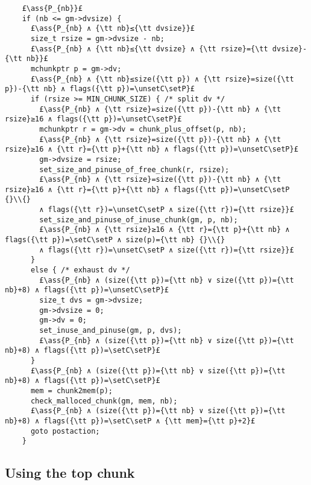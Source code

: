 \documentclass[10pt,a4paper,twoside]{report}
\makeatletter
\newcommand{\ml}[2][t]{\mbox{\mdseries\begin{tabular}[#1]{@{}L@{}}#2\end{tabular}}}
\newcommand{\ass}[1]{\ensuremath{{\color{blue}\left\{\ml[c]{#1}\right\}}}}
\newcommand{\setC}{\raisebox{1.5pt}{$\blacktriangledown$}}
\newcommand{\unsetC}{\raisebox{1.5pt}{$\triangledown$}}
\newcommand{\setP}{{\blacktriangle}}
\makeatother
\begin{document}
\begin{lstlisting}
    £\ass{P_{nb}}£
    if (nb <= gm->dvsize) {
      £\ass{P_{nb} ∧ {\tt nb}≤{\tt dvsize}}£
      size_t rsize = gm->dvsize - nb;
      £\ass{P_{nb} ∧ {\tt nb}≤{\tt dvsize} ∧ {\tt rsize}={\tt dvsize}-{\tt nb}}£
      mchunkptr p = gm->dv;
      £\ass{P_{nb} ∧ {\tt nb}≤size({\tt p}) ∧ {\tt rsize}=size({\tt p})-{\tt nb} ∧ flags({\tt p})=\unsetC\setP}£
      if (rsize >= MIN_CHUNK_SIZE) { /* split dv */
        £\ass{P_{nb} ∧ {\tt rsize}=size({\tt p})-{\tt nb} ∧ {\tt rsize}≥16 ∧ flags({\tt p})=\unsetC\setP}£
        mchunkptr r = gm->dv = chunk_plus_offset(p, nb);
        £\ass{P_{nb} ∧ {\tt rsize}=size({\tt p})-{\tt nb} ∧ {\tt rsize}≥16 ∧ {\tt r}={\tt p}+{\tt nb} ∧ flags({\tt p})=\unsetC\setP}£
        gm->dvsize = rsize;
        set_size_and_pinuse_of_free_chunk(r, rsize);
        £\ass{P_{nb} ∧ {\tt rsize}=size({\tt p})-{\tt nb} ∧ {\tt rsize}≥16 ∧ {\tt r}={\tt p}+{\tt nb} ∧ flags({\tt p})=\unsetC\setP {}\\{}
        ∧ flags({\tt r})=\unsetC\setP ∧ size({\tt r})={\tt rsize}}£
        set_size_and_pinuse_of_inuse_chunk(gm, p, nb);
        £\ass{P_{nb} ∧ {\tt rsize}≥16 ∧ {\tt r}={\tt p}+{\tt nb} ∧ flags({\tt p})=\setC\setP ∧ size(p)={\tt nb} {}\\{}
        ∧ flags({\tt r})=\unsetC\setP ∧ size({\tt r})={\tt rsize}}£
      }
      else { /* exhaust dv */
        £\ass{P_{nb} ∧ (size({\tt p})={\tt nb} ∨ size({\tt p})={\tt nb}+8) ∧ flags({\tt p})=\unsetC\setP}£
        size_t dvs = gm->dvsize;
        gm->dvsize = 0;
        gm->dv = 0;
        set_inuse_and_pinuse(gm, p, dvs);
        £\ass{P_{nb} ∧ (size({\tt p})={\tt nb} ∨ size({\tt p})={\tt nb}+8) ∧ flags({\tt p})=\setC\setP}£
      }
      £\ass{P_{nb} ∧ (size({\tt p})={\tt nb} ∨ size({\tt p})={\tt nb}+8) ∧ flags({\tt p})=\setC\setP}£
      mem = chunk2mem(p);
      check_malloced_chunk(gm, mem, nb);
      £\ass{P_{nb} ∧ (size({\tt p})={\tt nb} ∨ size({\tt p})={\tt nb}+8) ∧ flags({\tt p})=\setC\setP ∧ {\tt mem}={\tt p}+2}£
      goto postaction;
    }
\end{lstlisting}

\subsection*{Using the top chunk}
\end{document}
